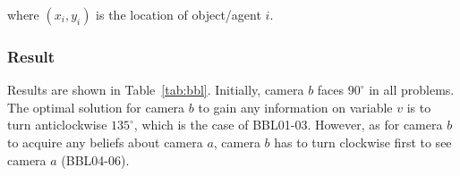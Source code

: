 \noindent where $(x_i,y_i)$ is the location of object/agent $i$.





\subsubsection{Result}

Results are shown in Table~\ref{tab:bbl}.
Initially, camera $b$ faces $90^\circ$ in all problems.
The optimal solution for camera $b$ to gain any information on variable $v$ is to turn anticlockwise $135^\circ$, which is the case of BBL01-03.
However, as for camera $b$ to acquire any beliefs about camera $a$, camera $b$ has to turn clockwise first to see camera $a$ (BBL04-06).


    
        
